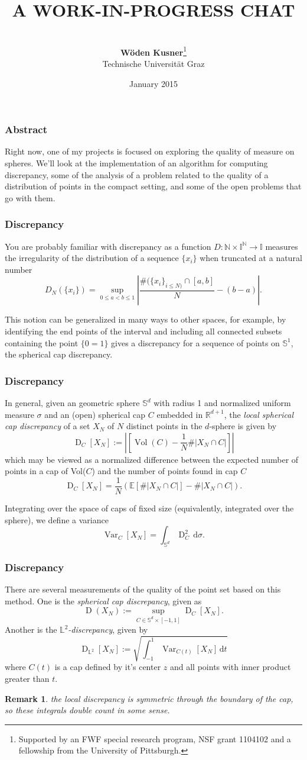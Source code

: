 \documentclass{beamer}
\title[]{A WORK-IN-PROGRESS CHAT
}
\author[W\"oden Kusner TU Graz]{\\ \textbf{W\"oden Kusner}\thanks{\tiny{Supported by an FWF special research program, NSF grant 1104102 and a fellowship from the University of Pittsburgh.}}\\
Technische Universit\"at Graz\\
\raisebox{-35pt}{
\texttt{[image: unilogo2.png]}}
}
\date[]{\small January 2015}
\newtheorem{remark}[equation]{Remark}
\theoremstyle{definition}
\begin{document}
\frame{\titlepage}

\frame
{
\frametitle{Abstract}
Right now, one of my projects is focused on exploring the quality of measure on spheres.  We'll look at the implementation of an algorithm for computing discrepancy, some of the analysis of a problem related to the quality of a distribution of points in the compact setting, and some of the open problems that go with them.
}



\frame
{
\frametitle{Discrepancy}

You are probably familiar with discrepancy as a function $D:\mathbb{N}\times \mathbb{I}^\mathbb{N}\rightarrow \mathbb{I}$ measures the irregularity of the distribution of a sequence $\{x_i\}$ when truncated at a natural number
\[
D_N(\{x_i\}) = \sup_{0 \le a < b \le 1} |\frac{\#( \{x_i\}_{i\le N)} \cap [a,b]}{N} - (b-a)|.
\]

This notion can be generalized in many ways to other spaces, for example, by identifying the end points of the interval and including all connected subsets containing the point $\{0=1\}$ gives a discrepancy for a sequence of points on $\mathbb{S}^1$, the spherical cap discrepancy.  

}


\frame
{
\frametitle{Discrepancy}

In general, given an geometric sphere  $\mathbb{S}^{d}$ with radius 1 and normalized uniform measure $\sigma$ and an (open) spherical cap $C$ embedded in $\mathbb{R}^{d+1}$, the \emph{ local spherical cap discrepancy} of a set $X_N$ of $N$ distinct points in the $d$-sphere is given by
\[
\operatorname{D}_C[X_N] := |[\operatorname{Vol}(C) - \frac{1}{N}\# |X_N \cap C| ]|
\]
which may be viewed as a normalized difference between the expected number of points in a cap of Vol($C$) and the number of points found in cap $C$
\[
\operatorname{D}_C[X_N] = \frac{1}{N}( \mathbb{E}[ \# |X_N \cap C|]- \#|X_N \cap C|) .
\]

Integrating over the space of caps of fixed size (equivalently, integrated over the sphere), we define a variance
\[
\operatorname{Var}_C[X_N] = \int_{\mathbb{S}^{d}} \operatorname{D}_C^2 \,\mathrm{d} \sigma.
\]


}



\frame
{
\frametitle{Discrepancy}

There are several measurements of the quality of the point set based on this method.  
One is the \emph{spherical cap discrepancy}, given as 
\[
\operatorname{D}(X_N) := \sup _{C\in \mathbb{S}^{d}\times [-1,1]}\operatorname{D}_C[X_N].
 \]
Another is the \emph{$\mathbb{L}^2$-discrepancy}, given by
\[
\operatorname{D}_{\mathbb{L}^2}[X_N]:= \sqrt{\int_{-1}^{1} \operatorname{Var}_{C(t)}[X_N]\,\mathrm{d}t}
\]
where $C(t)$ is a cap defined by it's center $z$ and all points with inner product greater than $t$.\begin{remark} the local discrepancy is symmetric through the boundary of the cap, so these integrals double count in some sense. \end{remark}

}
\end{document}
